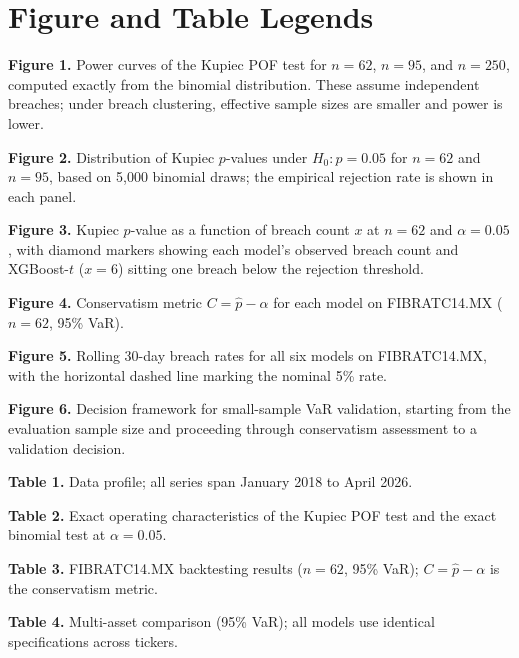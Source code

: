 \documentclass[12pt,a4paper]{article}
\begin{document}
\section*{Figure and Table Legends}

\textbf{Figure 1.} Power curves of the Kupiec POF test for $n = 62$, $n = 95$, and $n = 250$, computed exactly from the binomial distribution. These assume independent breaches; under breach clustering, effective sample sizes are smaller and power is lower.

\textbf{Figure 2.} Distribution of Kupiec $p$-values under $H_0: p = 0.05$ for $n = 62$ and $n = 95$, based on 5,000 binomial draws; the empirical rejection rate is shown in each panel.

\textbf{Figure 3.} Kupiec $p$-value as a function of breach count $x$ at $n = 62$ and $\alpha = 0.05$, with diamond markers showing each model's observed breach count and XGBoost-$t$ ($x = 6$) sitting one breach below the rejection threshold.

\textbf{Figure 4.} Conservatism metric $C = \hat{p} - \alpha$ for each model on FIBRATC14.MX ($n = 62$, 95\% VaR).

\textbf{Figure 5.} Rolling 30-day breach rates for all six models on FIBRATC14.MX, with the horizontal dashed line marking the nominal 5\% rate.

\medskip

\textbf{Figure 6.} Decision framework for small-sample VaR validation, starting from the evaluation sample size and proceeding through conservatism assessment to a validation decision.

\textbf{Table 1.} Data profile; all series span January 2018 to April 2026.

\textbf{Table 2.} Exact operating characteristics of the Kupiec POF test and the exact binomial test at $\alpha = 0.05$.

\textbf{Table 3.} FIBRATC14.MX backtesting results ($n = 62$, 95\% VaR); $C = \hat{p} - \alpha$ is the conservatism metric.

\textbf{Table 4.} Multi-asset comparison (95\% VaR); all models use identical specifications across tickers.

\bigskip
\end{document}
